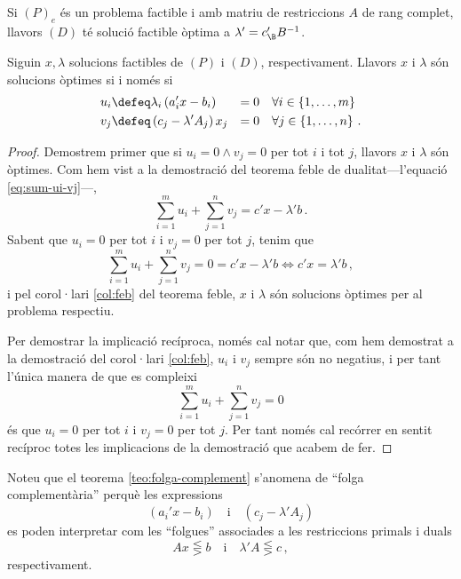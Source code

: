 \begin{col}
    Si $\left(P\right)_e$ és un problema factible i amb matriu de restriccions $A$ de rang complet, llavors $\left(D\right)$ té solució factible òptima a $\lambda' = c_\B'B^{-1}$.
\end{col}

\begin{teo}\label{teo:folga-complement}
    Siguin $x, \lambda$ solucions factibles de $\left(P\right)$ i $\left(D\right)$, respectivament. Llavors $x$ i $\lambda$ són solucions òptimes si i només si
    \begin{alignat*}{2}{}
        u_i &\defeq \lambda_i \left(a_i'x - b_i\right) &= 0 &\quad \forall i \in \left\{1, \dots, m\right\} \\
        v_j &\defeq \left(c_j - \lambda'A_j\right) x_j &= 0 &\quad \forall j \in \left\{1, \dots, n\right\}\,.
    \end{alignat*}
    \begin{proof}
    	Demostrem primer que si $u_i = 0 \land v_j = 0$ per tot $i$ i tot $j$, llavors $x$ i $\lambda$ són òptimes. Com hem vist a la demostració del teorema feble de dualitat---l'equació \eqref{eq:sum-ui-vj}---, 
    	\begin{equation*}
	    	\sum_{i = 1}^{m} u_i + \sum_{j = 1}^{n} v_j = c'x - \lambda'b\,.
    	\end{equation*}
    	Sabent que $u_i = 0$ per tot $i$ i $v_j = 0$ per tot $j$, tenim que \[\sum_{i = 1}^{m} u_i + \sum_{j = 1}^{n} v_j = 0 = c'x - \lambda'b \Leftrightarrow c'x = \lambda'b\,,  \] i pel corol·lari \ref{col:feb} del teorema feble, $x$ i $\lambda$ són solucions òptimes per al problema respectiu.
    	
    	Per demostrar la implicació recíproca, només cal notar que, com hem demostrat a la demostració del corol·lari \ref{col:feb}, $u_i$ i $v_j$ sempre són no negatius, i per tant l'única manera de que es compleixi \[\sum_{i=1}^{m} u_i + \sum_{j=1}^{n} v_j = 0 \] és que $u_i = 0$ per tot $i$ i $v_j = 0$ per tot $j$. Per tant només cal recórrer en sentit recíproc totes les implicacions de la demostració que acabem de fer.
    \end{proof}
\end{teo}

Noteu que el teorema \ref{teo:folga-complement} s'anomena de ``folga complementària'' perquè les expressions \[(a_i'x-b_i) \quad \text{i}\quad (c_j-\lambda'A_j) \] es poden interpretar com les ``folgues'' associades a les restriccions primals i duals \[Ax \lesseqgtr b \quad \text{i}\quad \lambda'A \lesseqgtr c\,,\] respectivament.

